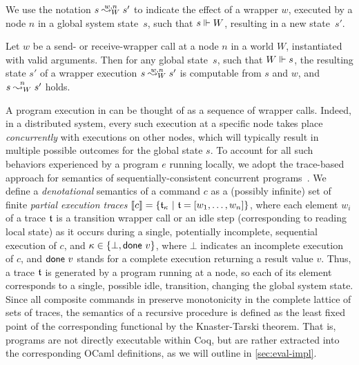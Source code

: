 We use the notation $\nsemw{W}{n}{s}{s'}$ to indicate the effect of a
wrapper $w$, executed by a node $n$ in a global system state~$s$, such
that $\Coh{s}{W}$, resulting in a new state~$s'$.

\begin{lemma}
\label{lm:wrap}
Let $w$ be a send- or receive-wrapper call at a node $n$ in a world
$W$, instantiated with valid arguments. Then for any global state~$s$,
such that $\Coh{W}{s}$, the resulting state $s'$ of a wrapper
execution $\nsemw{W}{n}{s}{s'}$ is computable from $s$ and $w$, and
$\nsem{W}{n}{s}{s'}$ holds.
\end{lemma}

%
A program execution in \disel can be thought of as a sequence of
wrapper calls.
%
Indeed, in a distributed system, every such execution at a specific
node takes place \emph{concurrently} with executions on other nodes,
which will typically result in multiple possible outcomes for the
global state $s$.
%
To account for all such behaviors experienced by a program $e$ running
locally, we adopt the trace-based approach for semantics of
sequentially-consistent concurrent programs~\cite{Brookes:TCS07}. We
define a \emph{denotational} semantics of a \disel command $c$ as a
(possibly infinite) set of finite \emph{partial execution traces}
$\denot{c} = \set{\trace_{\stat}~|~\trace = [w_1, \ldots, w_n]}$,
where each element $w_i$ of a trace $\trace$ is a transition wrapper
call or an idle step (corresponding to reading local state) as it
occurs during a single, potentially incomplete, sequential execution
of $c$, and $\stat \in \set{\bot, \done~v}$, where $\bot$ indicates an
incomplete execution of $c$, and $\done~v$ stands for a complete
execution returning a result value $v$.
%
%
Thus, a trace $\trace$ is generated by a program running at a node, so
each of its element corresponds to a single, possible idle,
transition, changing the global system state.
%
Since all composite commands in \disel preserve monotonicity in the
complete lattice of sets of traces, the semantics of a recursive
procedure is defined as the least fixed point of the corresponding
functional by the Knaster-Tarski theorem. That is, \disel programs are
not directly executable within Coq, but are rather extracted into the
corresponding OCaml definitions, as we will outline in
\cref{sec:eval-impl}.


